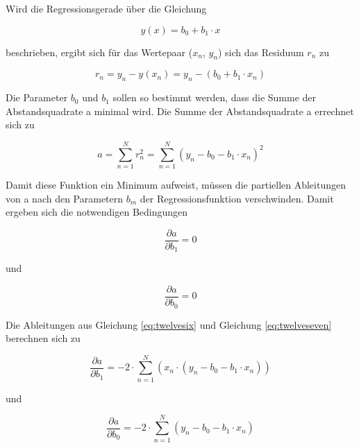 \noindent Wird die Regressionsgerade \"{u}ber die Gleichung

\begin{equation}\label{eq:twelvethree}
y(x)=b_{0} +b_{1} \cdot x
\end{equation}

\noindent beschrieben, ergibt sich f\"{u}r das Wertepaar ($x_{n}$, $y_{n}$) sich das Residuum $r_{n}$ zu

\begin{equation}\label{eq:twelvefour}
r_{n} =y_{n} -y(x_{n} )=y_{n} -(b_{0} +b_{1} \cdot x_{n})
\end{equation}

\noindent Die Parameter $b_{0}$ und $b_{1}$ sollen so bestimmt werden, dass die Summe der Abstandsquadrate a minimal wird. Die Summe der Abstandsquadrate a errechnet sich zu

\begin{equation}\label{eq:twelvefive}
a=\sum _{n=1}^{N}r_{n}^{2}  =\sum _{n=1}^{N}\left(y_{n} -b_{0} -b_{1} \cdot x_{n} \right)^{2}
\end{equation}

\noindent Damit diese Funktion ein Minimum aufweist, m\"{u}ssen die partiellen Ableitungen von a nach den Parametern $b_{m}$ der Regressionsfunktion verschwinden. Damit ergeben sich die notwendigen Bedingungen

\begin{equation}\label{eq:twelvesix}
\dfrac{\partial a}{\partial b_{1}} =0
\end{equation}

\noindent und 

\begin{equation}\label{eq:twelveseven}
\dfrac{\partial a}{\partial b_{0}} =0
\end{equation}

\noindent Die Ableitungen aus Gleichung \eqref{eq:twelvesix} und Gleichung \eqref{eq:twelveseven} berechnen sich zu

\begin{equation}\label{eq:twelveeight}
\dfrac{\partial a}{\partial b_{1}} =-2\cdot \sum _{n=1}^{N}\left(x_{n} \cdot (y_{n} -b_{0} -b_{1} \cdot x_{n})\right)
\end{equation}

\noindent und

\begin{equation}\label{eq:twelvenine}
\dfrac{\partial a}{\partial b_{0} } =-2\cdot \sum _{n=1}^{N}\left(y_{n} -b_{0} -b_{1} \cdot x_{n} \right)
\end{equation}

